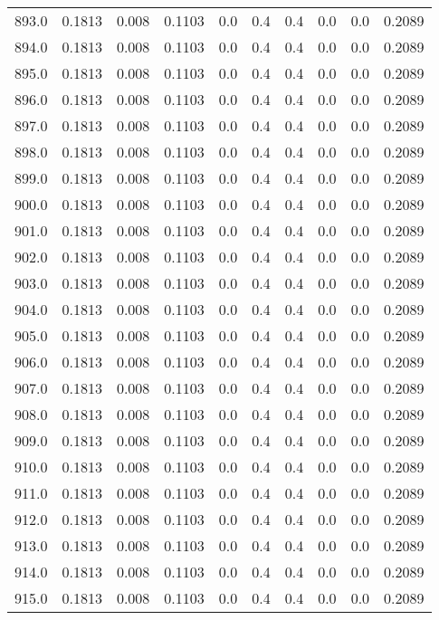 \begin{longtable}{lrrrrrrrrr}
893.0 & 0.1813 & 0.008 & 0.1103 & 0.0 & 0.4 & 0.4 & 0.0 & 0.0 & 0.2089 \\
894.0 & 0.1813 & 0.008 & 0.1103 & 0.0 & 0.4 & 0.4 & 0.0 & 0.0 & 0.2089 \\
895.0 & 0.1813 & 0.008 & 0.1103 & 0.0 & 0.4 & 0.4 & 0.0 & 0.0 & 0.2089 \\
896.0 & 0.1813 & 0.008 & 0.1103 & 0.0 & 0.4 & 0.4 & 0.0 & 0.0 & 0.2089 \\
897.0 & 0.1813 & 0.008 & 0.1103 & 0.0 & 0.4 & 0.4 & 0.0 & 0.0 & 0.2089 \\
898.0 & 0.1813 & 0.008 & 0.1103 & 0.0 & 0.4 & 0.4 & 0.0 & 0.0 & 0.2089 \\
899.0 & 0.1813 & 0.008 & 0.1103 & 0.0 & 0.4 & 0.4 & 0.0 & 0.0 & 0.2089 \\
900.0 & 0.1813 & 0.008 & 0.1103 & 0.0 & 0.4 & 0.4 & 0.0 & 0.0 & 0.2089 \\
901.0 & 0.1813 & 0.008 & 0.1103 & 0.0 & 0.4 & 0.4 & 0.0 & 0.0 & 0.2089 \\
902.0 & 0.1813 & 0.008 & 0.1103 & 0.0 & 0.4 & 0.4 & 0.0 & 0.0 & 0.2089 \\
903.0 & 0.1813 & 0.008 & 0.1103 & 0.0 & 0.4 & 0.4 & 0.0 & 0.0 & 0.2089 \\
904.0 & 0.1813 & 0.008 & 0.1103 & 0.0 & 0.4 & 0.4 & 0.0 & 0.0 & 0.2089 \\
905.0 & 0.1813 & 0.008 & 0.1103 & 0.0 & 0.4 & 0.4 & 0.0 & 0.0 & 0.2089 \\
906.0 & 0.1813 & 0.008 & 0.1103 & 0.0 & 0.4 & 0.4 & 0.0 & 0.0 & 0.2089 \\
907.0 & 0.1813 & 0.008 & 0.1103 & 0.0 & 0.4 & 0.4 & 0.0 & 0.0 & 0.2089 \\
908.0 & 0.1813 & 0.008 & 0.1103 & 0.0 & 0.4 & 0.4 & 0.0 & 0.0 & 0.2089 \\
909.0 & 0.1813 & 0.008 & 0.1103 & 0.0 & 0.4 & 0.4 & 0.0 & 0.0 & 0.2089 \\
910.0 & 0.1813 & 0.008 & 0.1103 & 0.0 & 0.4 & 0.4 & 0.0 & 0.0 & 0.2089 \\
911.0 & 0.1813 & 0.008 & 0.1103 & 0.0 & 0.4 & 0.4 & 0.0 & 0.0 & 0.2089 \\
912.0 & 0.1813 & 0.008 & 0.1103 & 0.0 & 0.4 & 0.4 & 0.0 & 0.0 & 0.2089 \\
913.0 & 0.1813 & 0.008 & 0.1103 & 0.0 & 0.4 & 0.4 & 0.0 & 0.0 & 0.2089 \\
914.0 & 0.1813 & 0.008 & 0.1103 & 0.0 & 0.4 & 0.4 & 0.0 & 0.0 & 0.2089 \\
915.0 & 0.1813 & 0.008 & 0.1103 & 0.0 & 0.4 & 0.4 & 0.0 & 0.0 & 0.2089 \\

\end{longtable}
